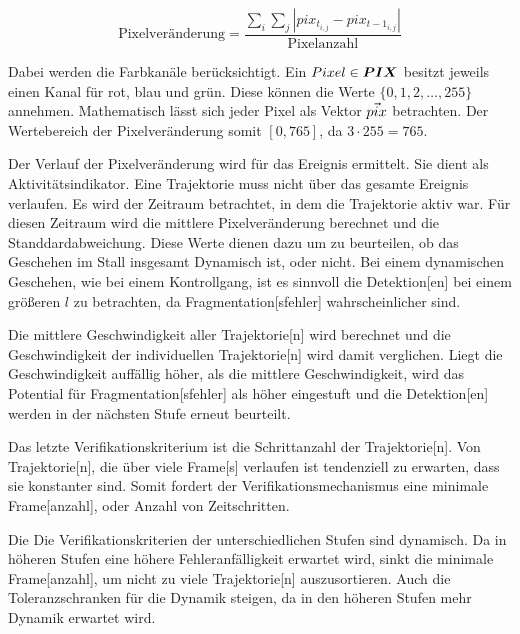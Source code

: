 \begin{equation}
\text{Pixelveränderung} = \frac{\sum_i \sum_j |pix_{t_{i,j}} - pix_{{t-1}_{i,j}}|}{\text{Pixelanzahl}}
\label{eq:Pixelveränderung}
\end{equation}

Dabei werden die Farbkanäle berücksichtigt. Ein \(Pixel \in \boldsymbol{PIX}\) besitzt jeweils einen Kanal für rot, blau und grün. Diese können die Werte \(\{0,1,2, \dots, 255\}\) annehmen. Mathematisch lässt sich jeder Pixel als Vektor \(\vec{pix}\) betrachten. Der Wertebereich der Pixelveränderung somit \([0, 765]\), da \(3 \cdot 255 = 765\). \par

Der Verlauf der Pixelveränderung wird für das Ereignis ermittelt. Sie dient als Aktivitätsindikator. Eine \gls{Trajektorie} muss nicht über das gesamte Ereignis verlaufen. Es wird der Zeitraum betrachtet, in dem die \gls{Trajektorie} aktiv war. Für diesen Zeitraum wird die mittlere Pixelveränderung berechnet und die Standdardabweichung. Diese Werte dienen dazu um zu beurteilen, ob das Geschehen im Stall insgesamt Dynamisch ist, oder nicht. Bei einem dynamischen Geschehen, wie bei einem Kontrollgang, ist es sinnvoll die \gls{Detektion}[en] bei einem größeren \(l\) zu betrachten, da \gls{Fragmentation}[sfehler] wahrscheinlicher sind. \par

Die mittlere Geschwindigkeit aller \gls{Trajektorie}[n] wird berechnet und die Geschwindigkeit der individuellen \gls{Trajektorie}[n] wird damit verglichen. Liegt die Geschwindigkeit auffällig höher, als die mittlere Geschwindigkeit, wird das Potential für \gls{Fragmentation}[sfehler] als höher eingestuft und die \gls{Detektion}[en] werden in der nächsten Stufe erneut beurteilt. \par

Das letzte Verifikationskriterium ist die Schrittanzahl der \gls{Trajektorie}[n]. Von \gls{Trajektorie}[n], die über viele \gls{Frame}[s] verlaufen ist tendenziell zu erwarten, dass sie konstanter sind. Somit fordert der Verifikationsmechanismus eine minimale \gls{Frame}[anzahl], oder Anzahl von Zeitschritten.\par

Die Die Verifikationskriterien der unterschiedlichen Stufen sind dynamisch. Da in höheren Stufen eine höhere Fehleranfälligkeit erwartet wird, sinkt die minimale \gls{Frame}[anzahl], um nicht zu viele \gls{Trajektorie}[n] auszusortieren. Auch die Toleranzschranken für die Dynamik steigen, da in den höheren Stufen mehr Dynamik erwartet wird. \par



